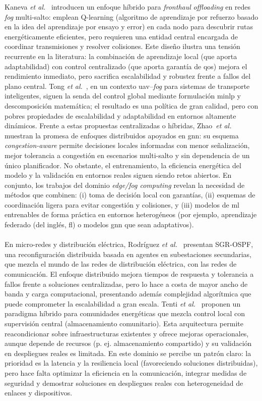 Kaneva \textit{et al.}~\cite{Kaneva21} introducen un enfoque híbrido para \textit{fronthaul} \textit{offloading} en redes \textit{fog} multi-salto: emplean Q-learning (algoritmo de aprendizaje por refuerzo basado en la idea del aprendizaje por ensayo y error) en cada nodo para descubrir rutas energéticamente eficientes, pero requieren una entidad central encargada de coordinar transmisiones y resolver colisiones. Este diseño ilustra una tensión recurrente en la literatura: la combinación de aprendizaje local (que aporta adaptabilidad) con control centralizado (que aporta garantía de \gls{qos}) mejora el rendimiento inmediato, pero sacrifica escalabilidad y robustez frente a fallos del plano central. Tong \textit{et al.}~\cite{Tong22}, en un contexto \gls{uav}–\textit{fog} para sistemas de transporte inteligentes, siguen la senda del control global mediante formulación \gls{minlp} y descomposición matemática; el resultado es una política de gran calidad, pero con pobres propiedades de escalabilidad y adaptabilidad en entornos altamente dinámicos. Frente a estas propuestas centralizadas o híbridas, Zhao~\textit{et al.}~\cite{Zhao24Z} muestran la promesa de enfoques distribuidos apoyados en \gls{gnn}: su esquema \textit{congestion-aware} permite decisiones locales informadas con menor señalización, mejor tolerancia a congestión en escenarios multi-salto y sin dependencia de un único planificador. No obstante, el entrenamiento, la eficiencia energética del modelo y la validación en entornos reales siguen siendo retos abiertos. En conjunto, los trabajos del dominio \textit{edge/fog computing} revelan la necesidad de métodos que combinen: (i) toma de decisión local con garantías, (ii) esquemas de coordinación ligera para evitar congestión y colisiones, y (iii) modelos de \gls{ml} entrenables de forma práctica en entornos heterogéneos (por ejemplo, aprendizaje federado (del inglés, \gls{fl}) o modelos \gls{gnn} que sean adaptativos).\\
\\
En micro-redes y distribución eléctrica, Rodríguez \textit{et al.}~\cite{Rodriguez16} presentan SGR-OSPF, una reconfiguración distribuida basada en agentes en subestaciones secundarias, que mezcla el mundo de las redes de distribución eléctrica, con las redes de comunicación. El enfoque distribuido mejora tiempos de respuesta y tolerancia a fallos frente a soluciones centralizadas, pero lo hace a costa de mayor ancho de banda y carga computacional, presentando además complejidad algorítmica que puede comprometer la escalabilidad a gran escala. Tenti \textit{et al.}~\cite{Tenti23} proponen un paradigma híbrido para comunidades energéticas que mezcla control local con supervisión central (almacenamiento comunitario). Esta arquitectura permite reacondicionar sobre infraestructuras existentes y ofrece mejoras operacionales, aunque depende de recursos (p. ej. almacenamiento compartido) y su validación en despliegues reales es limitada. En este dominio se percibe un patrón claro: la prioridad es la latencia y la resiliencia local (favoreciendo soluciones distribuidas), pero hace falta optimizar la eficiencia en la comunicación, integrar medidas de seguridad y demostrar soluciones en despliegues reales con heterogeneidad de enlaces y dispositivos.\\
